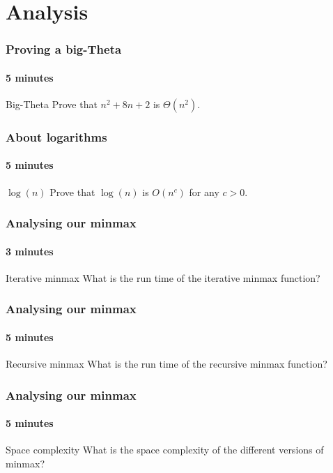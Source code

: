 \section{Analysis}
\label{sec:analysis}

\begin{frame}
	\frametitle{Proving a big-Theta}
	\framesubtitle{5 minutes}
	
	\begin{problemblock}{Big-Theta}
		Prove that $n^2 + 8n + 2$ is $\Theta(n^2)$.
	\end{problemblock}
\end{frame}

\begin{frame}
	\frametitle{About logarithms}
	\framesubtitle{5 minutes}

	\begin{problemblock}{$\log(n)$}
		Prove that $\log(n)$ is $O(n^c)$ for any $c>0$.
	\end{problemblock}
\end{frame}

\begin{frame}
	\frametitle{Analysing our minmax}
	\framesubtitle{3 minutes}
	\begin{problemblock}{Iterative minmax}
		What is the run time of the iterative minmax function?
	\end{problemblock}
	
\end{frame}

\begin{frame}
	\frametitle{Analysing our minmax}
	\framesubtitle{5 minutes}
	\begin{problemblock}{Recursive minmax}
		What is the run time of the recursive minmax function?
	\end{problemblock}
	
\end{frame}

\begin{frame}
	\frametitle{Analysing our minmax}
	\framesubtitle{5 minutes}
	\begin{problemblock}{Space complexity}
		What is the space complexity of the different versions of minmax?
	\end{problemblock}
	
\end{frame}
